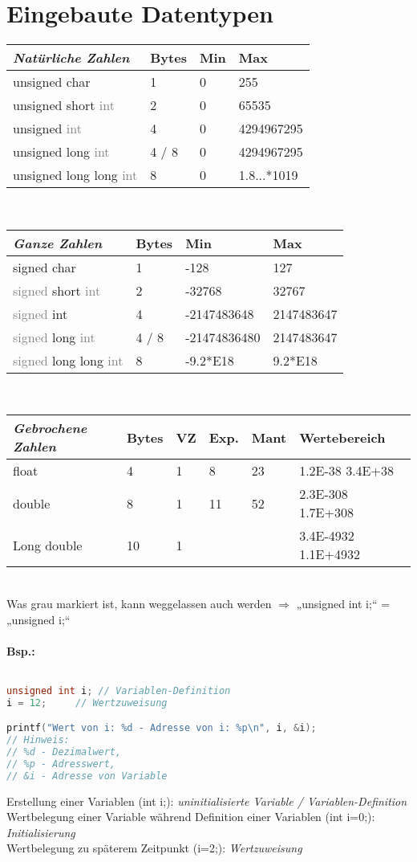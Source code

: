 \section{Eingebaute Datentypen}
\begin{tabular}{l | l l l}
\emph{Natürliche Zahlen} & Bytes & Min & Max\\
\hline
unsigned char&1&0&255\\
unsigned short \textcolor{gray}{int}&2&0&65535\\
unsigned \textcolor{gray}{int}&4&0&4294967295\\
unsigned long \textcolor{gray}{int}&4 / 8&0&4294967295\\
unsigned long long \textcolor{gray}{int}&8&0&1.8...*1019
\end{tabular}\medskip\\
\begin{tabular}{l | l l l}
\emph{Ganze Zahlen}&Bytes&Min&Max\\
\hline
signed char&1&-128&127\\
\textcolor{gray}{signed} short \textcolor{gray}{int}&2&-32768&32767\\
\textcolor{gray}{signed} int&4&-2147483648&2147483647\\
\textcolor{gray}{signed} long \textcolor{gray}{int}&4 / 8&-21474836480&2147483647\\
\textcolor{gray}{signed} long long \textcolor{gray}{int}&8&-9.2*E18&9.2*E18\\
\end{tabular}\medskip\\
\begin{tabular}{l | l l l l l}
\emph{Gebrochene Zahlen}&Bytes&VZ&Exp.&Mant&Wertebereich\\
\hline
float&4&1&8&23&1.2E-38 \quad 3.4E+38\\
double&8&1&11&52&2.3E-308 \quad 1.7E+308\\
Long double&10&1&&&3.4E-4932 \quad 1.1E+4932\\
\end{tabular}\medskip\\
Was grau markiert ist, kann weggelassen auch werden $\Rightarrow$ „unsigned int i;“ = „unsigned i;“

\paragraph{Bsp.:} $ $
\begin{lstlisting}[language=C]
unsigned int i;	// Variablen-Definition
i = 12;		// Wertzuweisung

printf("Wert von i: %d - Adresse von i: %p\n", i, &i);
// Hinweis: 
// %d - Dezimalwert, 
// %p - Adresswert, 
// &i - Adresse von Variable
\end{lstlisting}
Erstellung einer Variablen (int i;): \emph{uninitialisierte Variable / Variablen-Definition}\\
Wertbelegung einer Variable während Definition einer Variablen (int i=0;): \emph{Initialisierung}\\
Wertbelegung zu späterem Zeitpunkt (i=2;): \emph{Wertzuweisung}

